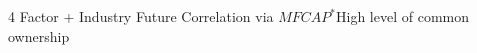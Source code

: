 \documentclass[handout]{beamer}
\begin{document}
	

	
	
%			
%			
%			
%	
	
	
	
	
	

		
		\begin{frame}{ 4 Factor + Industry Future  Correlation via $ MFCAP^* $}{High level of common ownership}\label{Monthly19}
		
		
		
		
		

\end{frame}
\end{document}
